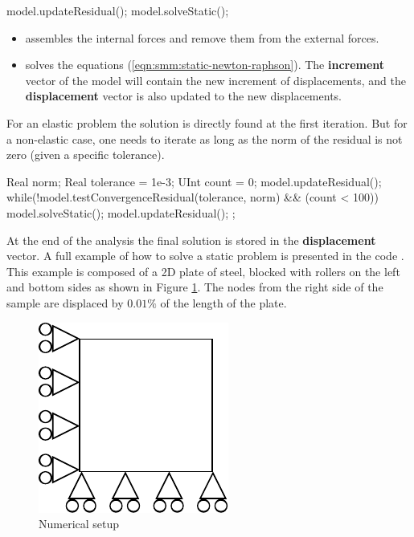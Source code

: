 \begin{cpp}
  model.updateResidual();
  model.solveStatic();
\end{cpp}
\begin{itemize}
\item {} assembles the  internal forces and remove them
  from the external forces.
\item        {}         solves        the        equations
  (\ref{eqn:smm:static-newton-raphson}).   The \textbf{increment} vector  of the
  model   will   contain  the   new   increment   of   displacements,  and   the
  \textbf{displacement} vector is also updated to the new displacements.
\end{itemize}

For  an   elastic  problem  the  solution   is  directly  found   at  the  first
iteration. But for a non-elastic case, one  needs to iterate as long as the norm
of the residual is not zero (given a specific tolerance).
\begin{cpp}
  Real norm;
  Real tolerance = 1e-3;
  UInt count = 0;
  model.updateResidual();
  while(!model.testConvergenceResidual(tolerance, norm) && (count < 100)) {
    model.solveStatic();
    model.updateResidual();
  };
\end{cpp}

At   the  end   of  the   analysis  the   final  solution   is  stored   in  the
\textbf{displacement} vector.  A  full example of how to  solve a static problem
is  presented  in   the  code  .   This
example is composed of a 2D plate of steel, blocked with rollers on the left and
bottom sides as shown in  Figure \ref{fig:smm:static}.  The nodes from the right
side of the sample are displaced by $0.01\%$ of the length of the plate.

\begin{figure}[!htb]
  \centering
  \includegraphics{figures/implicit_static}
  \caption{Numerical setup\label{fig:smm:static}}
\end{figure}

